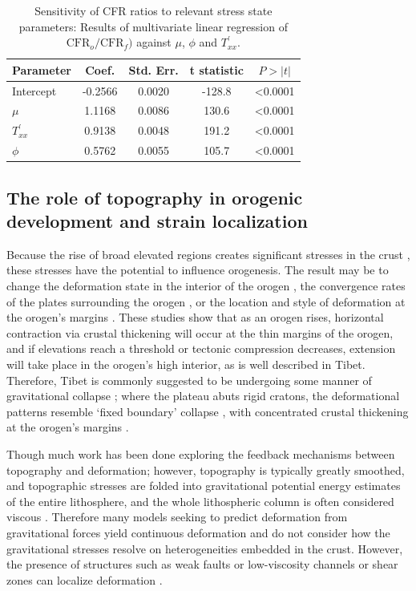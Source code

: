 \documentclass[twocolumn,jgrga]{AGUTeX}
\begin{document}
\begin{article}
\begin{table}[htb]
\centering
\begin{tabular}{l c c c c}
\hline
Parameter & Coef. & Std. Err. & t statistic & $P>|t|$ \\
\hline
Intercept & -0.2566 & 0.0020 & -128.8 & \textless{}0.0001 \\ 
$\mu$ & 1.1168 & 0.0086 & 130.6 & \textless{}0.0001 \\ 
$T^\prime_{xx}$ & 0.9138 & 0.0048 & 191.2 & \textless{}0.0001 \\ 
$\phi$ & 0.5762 & 0.0055 & 105.7 & \textless{}0.0001 \\ 
\hline
\end{tabular}
\caption{Sensitivity of CFR ratios to relevant stress state parameters:
Results of multivariate linear regression of
$\mathrm{CFR}_o/ \mathrm{CFR}_f)$ against $\mu$, $\phi$ and
$T^\prime_{xx}$.}
\label{table:cfr_regress}
\end{table}

\subsection{The role of topography in orogenic development and strain
localization}\label{the-role-of-topography-in-orogenic-development-and-strain-localization}

Because the rise of broad elevated regions creates significant stresses
in the crust \citep[e.g.,][]{jeffreys1924}, these stresses have the
potential to influence orogenesis. The result may be to change the deformation
state in the interior of the orogen \citep[e.g.,][]{dewey1988, molnar1988}, the
convergence rates of the plates surrounding the orogen \citep[e.g.][]
{meade2008}, or the location and style of deformation at the orogen's
margins \citep[e.g.,][]{beaumont2001, decelles2009}. These studies show that
as an orogen rises, horizontal contraction via crustal thickening will
occur at the thin margins of the orogen, and if elevations reach a
threshold or tectonic compression decreases, extension will take place
in the orogen's high interior, as is well described in Tibet. Therefore,
Tibet is commonly suggested to be undergoing some manner of
gravitational collapse \citep[e.g.,][]{england1989}; where the plateau abuts
rigid cratons, the deformational patterns resemble `fixed boundary'
collapse \citep{rey2001}, with concentrated crustal thickening at the
orogen's margins \citep[e.g.,][]{cook2008}.

Though much work has been done exploring the feedback mechanisms between
topography and deformation; however, topography is typically greatly smoothed,
and topographic stresses are folded into gravitational potential energy
estimates of the entire lithosphere, and the whole lithospheric column
is often considered viscous \citep{copleymckenzie2007}. Therefore many
models seeking to predict deformation from gravitational forces yield
continuous deformation and do not consider how the gravitational
stresses resolve on heterogeneities embedded in the crust. However, the
presence of structures such as weak faults \citep{bird1994} or
low-viscosity channels or shear zones \citep[e.g.,][]{clark2005} can localize
deformation \citep[e.g.,][]{bird1994, fleschbendick2012}.


\end{article}
\end{document}
